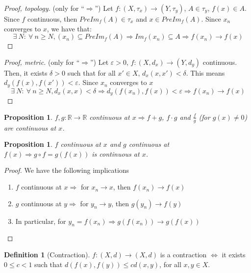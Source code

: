 \documentclass{article}
\newcommand{\Ar}{\Rightarrow}
\newenvironment{enumarabic}{\begin{enumerate}[label=(\arabic*)]}{\end{enumerate}}
\newcommand{\fr}[2]{\frac{#1}{#2}}
\newcommand{\f}[3]{#1 : #2 \rightarrow #3}
\newcommand{\fOnR}[1]{#1 : \mathbb{R} \rightarrow \mathbb{R}}
\theoremstyle{definition}
\newtheorem{definition}{Definition}[section]
\theoremstyle{definition}
\theoremstyle{plain}
\theoremstyle{plain}
\theoremstyle{plain}
\theoremstyle{plain}
\newtheorem{proposition}[theorem]{Proposition}
\theoremstyle{definition}
\theoremstyle{remark}
\theoremstyle{remark}
\theoremstyle{remark}
\theoremstyle{remark}
\newcommand{\ForAll}{\ \forall \ }
\newcommand{\Exists}{\ \exists \ }
\newcommand{\E}{\varepsilon}
\begin{document}
\begin{proof}[Proof, topology]
  (only for ``$\Ar$'') Let $\f{f}{(X,\tau_x)}{(Y,\tau_y)}$, $A \in \tau_y$, $f(x) \in A$. Since $f$ continuous, then $PreIm_f(A) \in \tau_x$ and $x \in PreIm_f(A)$. Since $x_n$ converges to $x$, we have that:
  \[
    \Exists N : \ForAll n \geq N, (x_n) \subseteq PreIm_f(A) \Ar
    Im_f(x_n) \subseteq A \Ar f(x_n) \to f(x)
  \]
\end{proof}

\begin{proof}[Proof, metric]
  (only for ``$\Ar$'') Let $\E > 0$, $\f{f}{(X,d_x)}{(Y,d_y)}$ continuous. Then, it exists $\delta > 0$ such that for all $x' \in X$, $d_x(x,x') < \delta$. This means $d_y(f(x),f(x')) < \E$. Since $x_n$ converges to $x$
  \[
    \Exists N : \ForAll n \geq N, d_x(x,x) < \delta \Ar d_y(f(x_n),f(x))
    < \E \Ar f(x_n) \to f(x)
  \]
\end{proof}



\begin{proposition}
  $\fOnR{f,g}$ continuous at $x \Ar f+g$, $f \cdot g$ and $\fr{f}{g}$ (for $g(x) \neq 0$) are continuous at $x$.
\end{proposition}


\begin{proposition}
  $f$ continuous at $x$ and $g$ continuous at $f(x) \Ar g \circ f = g(f(x))$ is continuous at $x$.
\end{proposition}

\begin{proof} We have the following implications
  \begin{enumarabic}
    \item $f$ continuous at $x \Ar$ for $x_n \to x$, then $f(x_n) \to f(x)$
    \item $g$ continuous at $y \Ar$ for $y_n \to y$, then $g(y_n) \to f(y)$
    \item In particular, for $y_n = f(x_n) \Ar g(f(x_n)) \to g(f(x))$
  \end{enumarabic}
\end{proof}


\begin{definition}[Contraction]
  $\f{f}{(X,d)}{(X,d)}$ is a contraction $\iff$ it exists $0 \leq c < 1$ such that $d(f(x),f(y)) \leq cd(x,y)$, for all $x,y \in X$.
\end{definition}
\end{document}
